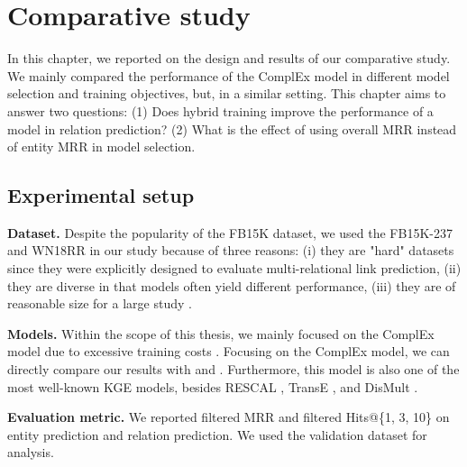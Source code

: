 
\chapter{Comparative study}
\label{chap:comparative_study}

In this chapter, we reported on the design and results of our comparative study. We mainly compared the performance of the ComplEx model in different model selection and training objectives, but, in a similar setting. This chapter aims to answer two questions: (1) Does hybrid training improve the performance of a model in relation prediction? (2) What is the effect of using overall MRR instead of entity MRR in model selection.

\section{Experimental setup}

\noindent\textbf{Dataset.} Despite the popularity of the FB15K dataset, we used the FB15K-237 and WN18RR in our study because of three reasons: (i) they are "hard" datasets since they were explicitly designed to evaluate multi-relational link prediction, (ii) they are diverse in that models often yield different performance, (iii) they are of reasonable size for a large study \citep{Ruffinelli2020You}.
\newline


\noindent\textbf{Models.} Within the scope of this thesis, we mainly focused on the ComplEx model due to excessive training costs \citep{trouillon2016complex}. Focusing on the ComplEx model, we can directly compare our results with \citet{chen2021relation} and \citet{Ruffinelli2020You}. Furthermore, this model is also one of the most well-known KGE models, besides RESCAL \citep{nickel2011three}, TransE \citep{bordes2013translating}, and DisMult \citep{yang2014embedding}. 
\newline

\noindent\textbf{Evaluation metric.} We reported filtered MRR and filtered Hits@\{1, 3, 10\} on entity prediction and relation prediction. We used the validation dataset for analysis.
\newline

